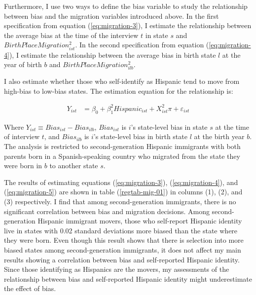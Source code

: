 \documentclass[12pt,english]{article}
\begin{document}
Furthermore, I use two ways to define the bias variable to study the relationship between bias and the migration variables introduced above. In the first specification from equation (\ref{eq:migration-3}), I estimate the relationship between the average bias at the time of the interview $t$ in state $s$ and $BirthPlaceMigration_{ist}^2$. In the second specification from equation (\ref{eq:migration-4}), I estimate the relationship between the average bias in birth state $l$ at the year of birth $b$ and $BirthPlaceMigration_{ilb}^2$.

I also estimate whether those who self-identify as Hispanic tend to move from high-bias to low-bias states. The estimation equation for the relationship is: 

\begin{align}
Y_{ist} &= \beta_0 + \beta_1^2 Hispanic_{ist} +
                   X_{ist}^2\pi
                   + \varepsilon_{ist} \label{eq:migration-5}
\end{align}

Where $Y_{ist} \equiv Bias_{ist} -  Bias_{ilb}$, $Bias_{ist}$ is $i$'s state-level bias in state $s$ at the time of interview $t$, and  $Bias_{ilb}$ is $i$'s state-level bias in birth state $l$ at the birth year $b$. The analysis is restricted to second-generation Hispanic immigrants with both parents born in a Spanish-speaking country who migrated from the state they were born in $b$ to another state $s$. 

The results of estimating equations (\ref{eq:migration-3}), (\ref{eq:migration-4}), and (\ref{eq:migration-5}) are shown in table (\ref{regtab-mig-01}) in columns (1), (2), and (3) respectively. I find that among second-generation immigrants, there is no significant correlation between bias and migration decisions. Among second-generation Hispanic immigrant movers, those who self-report Hispanic identity live in states with 0.02 standard deviations more biased than the state where they were born. Even though this result shows that there is selection into more biased states among second-generation immigrants, it does not affect my main results showing a correlation between bias and self-reported Hispanic identity. Since those identifying as Hispanics are the movers, my assessments of the relationship between bias and self-reported Hispanic identity might underestimate the effect of bias.




\end{document}
